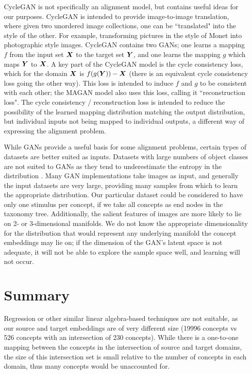 CycleGAN \cite{CycleGAN} is not specifically an alignment model, but contains useful ideas for our purposes. CycleGAN is intended to provide image-to-image translation, where given two unordered image collections, one can be ``translated" into the style of the other. For example, transforming pictures in the style of Monet into photographic style images. CycleGAN contains two GANs; one learns a mapping $f$ from the input set $\boldsymbol{X}$ to the target set $\boldsymbol{Y}$, and one learns the mapping $g$ which maps $\boldsymbol{Y}$ to $\boldsymbol{X}$. A key part of the CycleGAN model is the cycle consistency loss, which for the domain $\boldsymbol{X}$ is $f(g(\boldsymbol{Y})) - \boldsymbol{X}$ (there is an equivalent cycle consistency loss going the other way). This loss is intended to induce $f$ and $g$ to be consistent with each other; the MAGAN model also uses this loss, calling it ``reconstruction loss". The cycle consistency / reconstruction loss is intended to reduce the possibility of the learned mapping distribution matching the output distribution, but individual inputs not being mapped to individual outputs, a different way of expressing the alignment problem. 

While GANs provide a useful basis for some alignment problems, certain types of datasets are better suited as inputs. Datasets with large numbers of object classes are not suited to GANs as they tend to underestimate the entropy in the distribution \cite{ImprovedTechniquesTrainingGANS}. Many GAN implementations take images as input, and generally the input datasets are very large, providing many samples from which to learn the appropriate distribution. Our particular dataset could be considered to have only one stimulus per concept, if we take all concepts as end nodes in the taxonomy tree.  Additionally, the salient features of images are more likely to lie on 2- or 3-dimensional manifolds. We do not know the appropriate dimensionality for the distribution that would represent any underlying manifold the concept embeddings may lie on; if the dimension of the GAN's latent space is not adequate, it will not be able to explore the sample space well, and learning will not occur. 

\section{Summary}
Regression or other similar linear algebra-based techniques are not suitable, as our source and target embeddings are of very different size (19996 concepts vs 526 concepts with an intersection of 230 concepts). While there is a one-to-one mapping between the concepts in the intersection of source and target domains, the size of this intersection set is small relative to the number of concepts in each domain, thus many concepts would be unaccounted for. 

